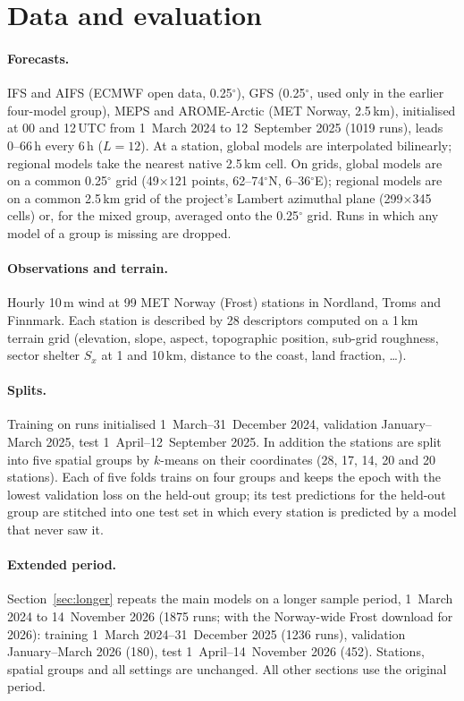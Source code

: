 \documentclass[10pt,a4paper]{article}
\begin{document}
\section{Data and evaluation}\label{sec:data}
\paragraph{Forecasts.} IFS and AIFS (ECMWF open data, 0.25$^\circ$), GFS (0.25$^\circ$, used only in
the earlier four-model group), MEPS and AROME-Arctic (MET Norway, 2.5\,km), initialised at 00
and 12\,UTC from 1~March 2024 to 12~September 2025 (1019 runs), leads 0--66\,h every 6\,h
($L=12$). At a station, global models are interpolated bilinearly; regional models take the
nearest native 2.5\,km cell. On grids, global models are on a common 0.25$^\circ$ grid
(49$\times$121 points, 62--74$^\circ$N, 6--36$^\circ$E); regional models are on a common 2.5\,km
grid of the project's Lambert azimuthal plane (299$\times$345 cells) or, for the mixed group,
averaged onto the 0.25$^\circ$ grid. Runs in which any model of a group is missing are dropped.

\paragraph{Observations and terrain.} Hourly 10\,m wind at 99 MET Norway (Frost) stations in
Nordland, Troms and Finnmark. Each station is described by 28 descriptors computed on a 1\,km
terrain grid (elevation, slope, aspect, topographic position, sub-grid roughness, sector
shelter $S_x$ at 1 and 10\,km, distance to the coast, land fraction, \ldots).

\paragraph{Splits.} Training on runs initialised 1~March--31~December 2024, validation
January--March 2025, test 1~April--12~September 2025. In addition the stations are split into
five spatial groups by $k$-means on their coordinates (28, 17, 14, 20 and 20 stations). Each of
five folds trains on four groups and keeps the epoch with the lowest validation loss on the
held-out group; its test predictions for the held-out group are stitched into one test set in
which every station is predicted by a model that never saw it.

\paragraph{Extended period.} Section~\ref{sec:longer} repeats the main models on a longer sample
period, 1~March 2024 to 14~November 2026 (1875 runs; with the Norway-wide Frost download for 2026):
training 1~March 2024--31~December 2025 (1236 runs), validation January--March 2026 (180), test
1~April--14~November 2026 (452). Stations, spatial groups and all settings are unchanged. All other
sections use the original period.
\end{document}
